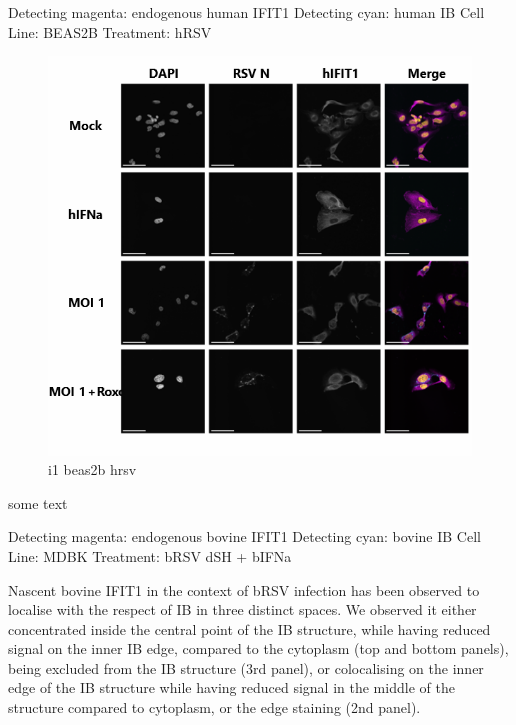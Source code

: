 Detecting magenta: endogenous human IFIT1 \newline
Detecting cyan: human IB \newline
Cell Line: BEAS2B \newline
Treatment: hRSV \newline

\begin{figure}
    \centering
    \includegraphics[width=1\linewidth]{08. Chapter 3/Figs/02. IFIT1/05. beas2b hrsv.png}
    \caption[i1 beas2b hrsv]{i1 beas2b hrsv}
    \label{i1 beas2b hrsv}
\end{figure}

 \label{bIFIT1 Localisation During h/bRSV Infection}
some text

Detecting magenta: endogenous bovine IFIT1 \newline
Detecting cyan: bovine IB \newline
Cell Line: MDBK \newline
Treatment: bRSV dSH + bIFNa \newline

Nascent bovine IFIT1 in the context of bRSV infection has been observed to localise with the respect of IB in three distinct spaces. We observed it either concentrated inside the central point of the IB structure, while having reduced signal on the inner IB edge, compared to the cytoplasm (top and bottom panels), being excluded from the IB structure (3rd panel), or colocalising on the inner edge of the IB structure while having reduced signal in the middle of the structure compared to cytoplasm, or the edge staining (2nd panel).

